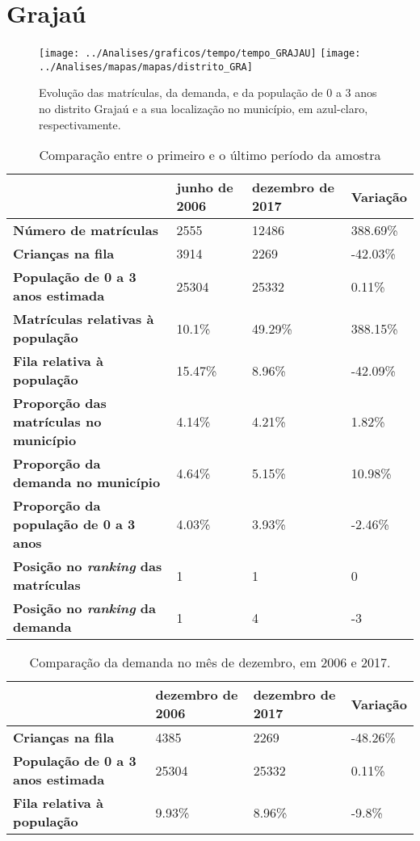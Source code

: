 \section{Grajaú}
\begin{figure}[H]
\centering
\texttt{[image: ../Analises/graficos/tempo/tempo\_GRAJAU]}
\texttt{[image: ../Analises/mapas/mapas/distrito\_GRA]}
\caption{Evolução das matrículas, da demanda, e da população de 0 a 3 anos no distrito Grajaú e a sua localização no município, em azul-claro, respectivamente.}
\end{figure}
\begin{table}[H]
\begin{tabular}{l|l|l|l}
\textbf{}                                      & \textbf{junho de 2006}       & \textbf{dezembro de 2017}    & \textbf{Variação} \\ \hline
\textbf{Número de matrículas}                  & 2555 & 12486 & 388.69\% \\ \hline
\textbf{Crianças na fila}                      & 3914 & 2269 & -42.03\% \\ \hline
\textbf{População de 0 a 3 anos estimada}      & 25304 & 25332 & 0.11\% \\ \hline
\textbf{Matrículas relativas à população}      & 10.1\% & 49.29\% & 388.15\% \\ \hline
\textbf{Fila relativa à população}             & 15.47\% & 8.96\% & -42.09\% \\ \hline
\textbf{Proporção das matrículas no município} & 4.14\% & 4.21\% & 1.82\% \\ \hline
\textbf{Proporção da demanda no município}     & 4.64\% & 5.15\% & 10.98\% \\ \hline
\textbf{Proporção da população de 0 a 3 anos}  & 4.03\% & 3.93\% & -2.46\% \\ \hline
\textbf{Posição no \textit{ranking} das matrículas}     & 1 & 1 & 0 \\ \hline
\textbf{Posição no \textit{ranking} da demanda}         & 1 & 4 & -3 \\ 
\end{tabular}
\caption{Comparação entre o primeiro e o último período da amostra}
\end{table}
\begin{table}[H]
\begin{tabular}{l|l|l|l}
\textbf{}                                 & \textbf{dezembro de 2006} & \textbf{dezembro de 2017} & \textbf{Variação} \\ \hline
\textbf{Crianças na fila}                      & 4385 & 2269 & -48.26\% \\ \hline
\textbf{População de 0 a 3 anos estimada}      & 25304 & 25332 & 0.11\% \\ \hline
\textbf{Fila relativa à população}             & 9.93\% & 8.96\% & -9.8\% \\
\end{tabular}
\caption{Comparação da demanda no mês de dezembro, em 2006 e 2017.}
\end{table}
